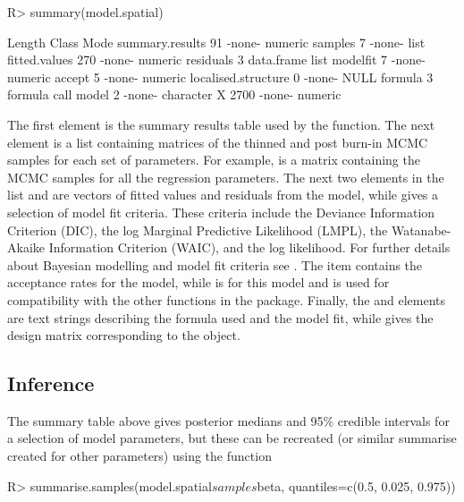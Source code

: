 \documentclass[article,shortnames,nojss]{jss}
\begin{document}
\begin{CodeInput}
R> summary(model.spatial)
\end{CodeInput}

\begin{CodeOutput}
Length Class   Mode     
summary.results       91   -none-  numeric  
samples                7   -none-  list     
fitted.values        270   -none-  numeric  
residuals              3   data.frame list   
modelfit               7   -none-  numeric  
accept                 5   -none-  numeric  
localised.structure    0   -none-  NULL     
formula                3   formula call     
model                  2   -none-  character
X                   2700   -none-  numeric  
\end{CodeOutput}



The first element is the summary results table used by the  function. The next element is a list containing matrices of the thinned and post burn-in MCMC samples for each set of parameters.  For example,  is a matrix containing the MCMC samples for all the regression parameters. The next two elements in the list   and  are vectors of fitted values and residuals from the model, while  gives a selection of model fit criteria. These criteria include the Deviance Information Criterion (DIC), the log Marginal Predictive Likelihood (LMPL), the Watanabe-Akaike Information Criterion (WAIC), and the log likelihood. For further details about Bayesian modelling and model fit criteria see \cite{gelman2003}. The item  contains the acceptance rates for the model, while  is  for this model and is used for compatibility with the other functions in the package. Finally, the  and  elements are text strings describing the formula used and the model fit, while  gives the design matrix corresponding to the  object.

\subsection{Inference}
The summary table above gives posterior medians and 95$\%$ credible intervals for a selection of model parameters, but these can be recreated (or similar summarise created for other parameters) using the function

\begin{CodeInput}
R> summarise.samples(model.spatial$samples$beta, quantiles=c(0.5, 0.025, 0.975))
\end{CodeInput}
\end{document}
